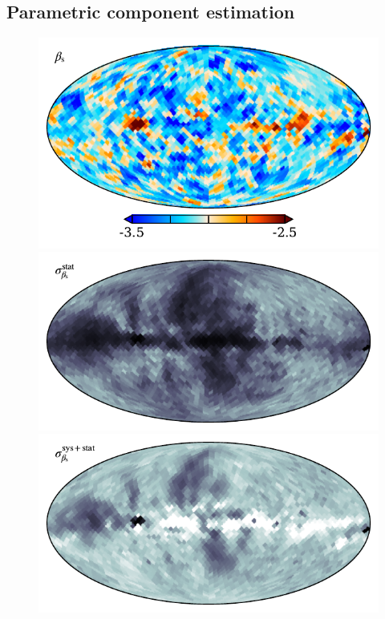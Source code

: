 \documentclass[twocolumn]{../../common/aa}
\begin{document}


\subsection{Parametric component estimation}
\label{sec:comm1}

\begin{figure}
	\centering
	\includegraphics[width=\columnwidth]{figures/beta_n0016_mu.pdf}\\
	\includegraphics[width=\columnwidth]{figures/beta_n0016_sd_samp.pdf}\\
	\includegraphics[width=\columnwidth]{figures/beta_n0016_sd_stat_inst.pdf}\\

\end{figure}
\end{document}
